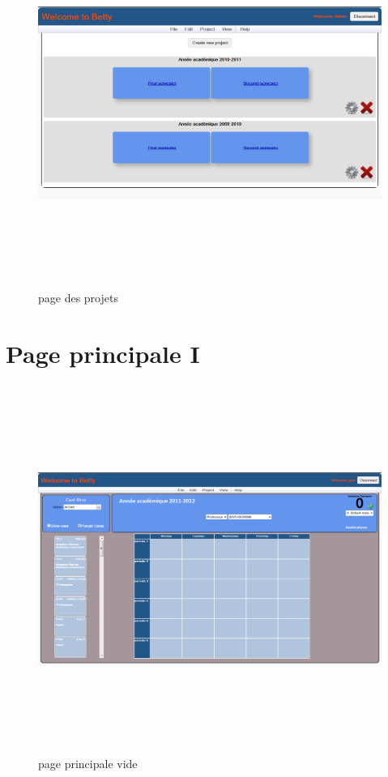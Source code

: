 \begin{figure}[!h]
	\begin{center}
		\includegraphics[width=19cm,height=12cm,angle=90]{ProjectPage.png}
		\caption{page des projets}
	\end{center}
\end{figure}\newpage

\newpage

\section{Page principale I}
\label{annexe/espace_nom}

\begin{figure}[!h]
	\begin{center}
		\includegraphics[width=19cm,height=12cm,angle=90]{MainPageClean.png}
		\caption{page principale vide}
	\end{center}
\end{figure}

